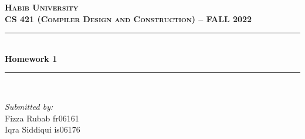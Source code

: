 \documentclass[12pt]{article}
\begin{document}
\begin{titlepage}

\newcommand{\HRule}{\rule{\linewidth}{0.5mm}} %

\center %
 

\textsc{\LARGE \textbf{Habib University}}\\[1.5cm] %
\textsc{\large \textbf{CS 421 (Compiler Design and Construction) – FALL 2022}}\\[0.5cm] %


\HRule \\[0.4cm]
{ \huge \bfseries Homework 1}\\[0.4cm] %
\HRule \\[1.5cm]
 

\begin{minipage}{0.4\textwidth}
\begin{center}
\emph{Submitted by:}\\ 
Fizza Rubab 	 fr06161	\\
Iqra Siddiqui			 is06176\\
\end{center}
\end{minipage}
~
\begin{minipage}{0.4\textwidth}
\end{minipage}\\[2cm]



\end{titlepage}
\end{document}
